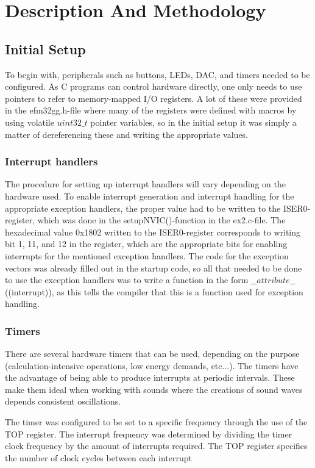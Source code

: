 \section{Description And Methodology}

\subsection{Initial Setup}
To begin with, peripherals such as buttons, LEDs, DAC, and timers needed to be configured. As C programs can control hardware directly, one only needs to use pointers to refer to memory-mapped I/O registers. A lot of these were provided in the efm32gg.h-file where many of the registers were defined with macros by using volatile $uint32\_t$ pointer variables, so in the initial setup it was simply a matter of dereferencing these and writing the appropriate values.


\subsubsection{Interrupt handlers}
The procedure for setting up interrupt handlers will vary depending on the hardware used. To enable interrupt generation and interrupt handling for the appropriate exception handlers, the proper value had to be written to the ISER0-register, which was done in the setupNVIC()-function in the ex2.c-file. The hexadecimal value 0x1802 written to the ISER0-register corresponds to writing bit 1, 11, and 12 in the register, which are the appropriate bits for enabling interrupts for the mentioned exception handlers.
	The code for the exception vectors was already filled out in the startup code, so all that needed to be done to use the exception handlers was to write a function in the form $\_\_attribute\_\_$ ((interrupt)), as this tells the compiler that this is a function used for exception handling.


\subsubsection{Timers}
There are several hardware timers that can be used, depending on the purpose (calculation-intensive operations, low energy demands, etc...). The timers have the advantage of being able to produce interrupts at periodic intervals. These make them ideal when working with sounds where the creations of sound waves depends consistent oscillations. 

The timer was configured to be set to a specific frequency through the use of the TOP register. The interrupt frequency was determined by dividing the timer clock frequency by the amount of interrupts required. The TOP register specifies the number of clock cycles between each interrupt


